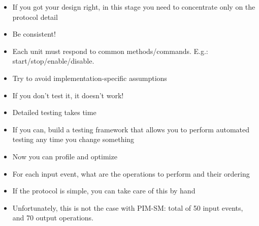 \documentclass[landscape]{icsislides}
\begin{document}
\begin{slide}

\begin{itemize}

  \item If you got your design right, in this stage you need to concentrate
  only on the protocol detail

  \item Be consistent!

  \item Each unit must respond to common methods/commands. E.g.:
  start/stop/enable/disable.

  \item Try to avoid implementation-specific assumptions

\end{itemize}

\end{slide}

\begin{slide}

\begin{itemize}

  \item If you don't test it, it doesn't work!

  \item Detailed testing takes time

  \item If you can, build a testing framework that allows you to perform
  automated testing any time you change something

  \item Now you can profile and optimize

\end{itemize}

\end{slide}

\begin{slide}

\begin{itemize}

  \item For each input event, what are the operations to perform and their
  ordering

  \item If the protocol is simple, you can take care of this by hand

  \item Unfortunately, this is not the case with PIM-SM:
  total of 50 input events, and 70 output operations.   

\end{itemize}

\end{slide}
\end{document}
